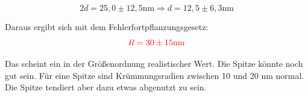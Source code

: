 \begin{equation*}
    2d = 25,0\pm12,5\mathrm{nm} \Rightarrow d = 12,5\pm 6,3 \mathrm{nm} 
\end{equation*}

Daraus ergibt sich mit dem Fehlerfortpflanzungsgesetz:\\

\begin{equation}
    \textcolor{red}{R = 30\pm15 \mathrm{nm}}
\end{equation}

Das scheint ein in der Größenordnung realistischer Wert. Die Spitze könnte noch gut sein. Für eine Spitze sind Krümmungsradien zwischen 
10 und 20 nm normal. Die Spitze tendiert aber dazu etwas abgenutzt zu sein.